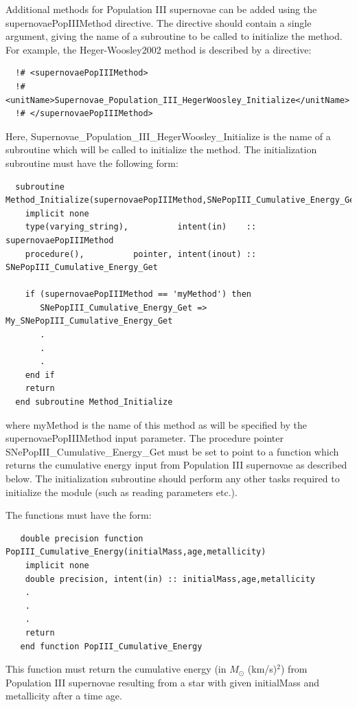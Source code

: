 Additional methods for Population III supernovae can be added using the {\normalfont \ttfamily supernovaePopIIIMethod} directive. The directive should contain a single argument, giving the name of a subroutine to be called to initialize the method. For example, the {\normalfont \ttfamily Heger-Woosley2002} method is described by a directive:
\begin{verbatim}
  !# <supernovaePopIIIMethod>
  !#  <unitName>Supernovae_Population_III_HegerWoosley_Initialize</unitName>
  !# </supernovaePopIIIMethod>
\end{verbatim}
Here, {\normalfont \ttfamily Supernovae\_Population\_III\_HegerWoosley\_Initialize} is the name of a subroutine which will be called to initialize the method. The initialization subroutine must have the following form:
\begin{verbatim}
  subroutine Method_Initialize(supernovaePopIIIMethod,SNePopIII_Cumulative_Energy_Get)
    implicit none
    type(varying_string),          intent(in)    :: supernovaePopIIIMethod
    procedure(),          pointer, intent(inout) :: SNePopIII_Cumulative_Energy_Get
    
    if (supernovaePopIIIMethod == 'myMethod') then
       SNePopIII_Cumulative_Energy_Get => My_SNePopIII_Cumulative_Energy_Get
       .
       .
       .
    end if
    return
  end subroutine Method_Initialize
\end{verbatim}
where {\normalfont \ttfamily myMethod} is the name of this method as will be specified by the {\normalfont \ttfamily supernovaePopIIIMethod} input parameter. The procedure pointer {\normalfont \ttfamily SNePopIII\_Cumulative\_Energy\_Get} must be set to point to a function which returns the cumulative energy input from Population III supernovae as described below. The initialization subroutine should perform any other tasks required to initialize the module (such as reading parameters etc.).

The functions must have the form:
\begin{verbatim}
   double precision function PopIII_Cumulative_Energy(initialMass,age,metallicity)
    implicit none
    double precision, intent(in) :: initialMass,age,metallicity
    .
    .
    .
    return
   end function PopIII_Cumulative_Energy 
\end{verbatim}
This function must return the cumulative energy (in $M_\odot$ (km/s)$^2$) from Population III supernovae resulting from a star with given {\normalfont \ttfamily initialMass} and {\normalfont \ttfamily metallicity} after a time {\normalfont \ttfamily age}.

